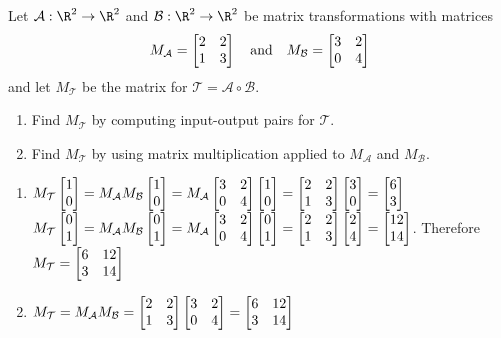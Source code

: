 \begin{exercises}
\begin{problist}
		\prob Let $\mathcal A: \R^{2}\to \R^{2}$ and
		$\mathcal B: \R^{2}\to \R^{2}$ be matrix transformations with matrices
		\[
			M_{\mathcal A}= \mat{2&2\\1&3}\quad \text{and}\quad M_{\mathcal B}=
			\mat{3&2\\0&4}
		\]
		 and let $M_{\mathcal T}$ be the matrix for
		$\mathcal T=\mathcal A\circ\mathcal B$.
		\begin{enumerate}
			\item Find $M_{\mathcal T}$ by computing input-output pairs for $\mathcal
				T$.

			\item Find $M_{\mathcal T}$ by using matrix multiplication applied
				to $M_{\mathcal A}$ and $M_{\mathcal B}$.
		\end{enumerate}


		\begin{solution}

			\begin{enumerate}
				\item $M_{\mathcal T}\mat{1\\0}= M_{\mathcal A}M_{\mathcal
					B}\mat{1\\0}= M_{\mathcal A}\mat{3&2\\0&4}\mat{1\\0}=
					\mat{2&2\\1&3}\mat{3\\0}= \mat{6\\3}$ \\ $M_{\mathcal
					T}\mat{0\\1}= M_{\mathcal A}M_{\mathcal B}\mat{0\\1}=
					M_{\mathcal A}\mat{3&2\\0&4}\mat{0\\1}= \mat{2&2\\1&3}\mat{2\\4}=
					\mat{12\\14}$. Therefore
					$M_{\mathcal T}= \mat{6&12\\3&14}$

				\item $M_{\mathcal T}= M_{\mathcal A}M_{\mathcal B}= \mat{2&2\\1&3}\mat{3&2\\0&4}=
					\mat{6&12\\3&14}$
			\end{enumerate}
		\end{solution}


\end{problist}
\end{exercises}
